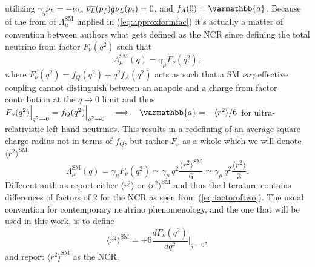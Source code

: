 utilizing $\gamma_5 \nu_L = - \nu_L$, $\overline{\nu_L}(p_f)\slashed{q}\nu_L(p_i)=0$, and $f_A(0) = \varmathbb{a}$. Because of the from of $\Lambda^{\text{SM}}_\mu$ implied in (\ref{eq:approxformfac}) it's actually a matter of convention between authors what gets defined as the NCR since defining the total neutrino from factor $F_\nu(q^2)$ such that
\begin{equation}
	\Lambda^{\text{SM}}_\mu(q) = \gamma_\mu F_{\nu}(q^2),
\end{equation}
where $F_{\nu}(q^2) = f_{Q}(q^2) + q^2f_A(q^2)$ acts as such that a SM $\nu\nu\gamma$ effective coupling cannot distinguish between an anapole and a charge from factor contribution at the $q\to0$ limit and thus $F_{\nu}(q^2)\Big|_{q^2\to 0}=f_{Q}(q^2)\Big|_{q^2\to 0}~~\implies~~\varmathbb{a} = -\langle r^2 \rangle /6$ for ultra-relativistic left-hand neutrinos. This results in a redefining of an average square charge radius not in terms of $f_Q$, but rather $F_{\nu}$ as a whole which we will denote $\langle r^2 \rangle^\text{SM}$
\begin{equation}\label{eq:factoroftwo}
	\Lambda^{\text{SM}}_\mu(q) = \gamma_\mu F_{\nu}(q^2) \simeq \gamma_\mu\,q^2\frac{\langle r^2 \rangle^\text{SM}}{6} \simeq \gamma_\mu\,q^2\frac{\langle r^2 \rangle}{3}.
\end{equation}
Different authors report either $\langle r^2 \rangle$ or $\langle r^2 \rangle^\text{SM}$ and thus the literature contains differences of factors of 2 for the NCR as seen from (\ref{eq:factoroftwo}). The usual convention for contemporary neutrino phenomenology, and the one that will be used in this work, is to define 
\begin{equation}\label{eq:trueNCR}
	\langle r^2 \rangle^\text{SM} = +6\frac{dF_\nu(q^2)}{dq^2}\Big|_{q=0},
\end{equation}
and report $\langle r^2 \rangle^\text{SM}$ as the NCR. 
